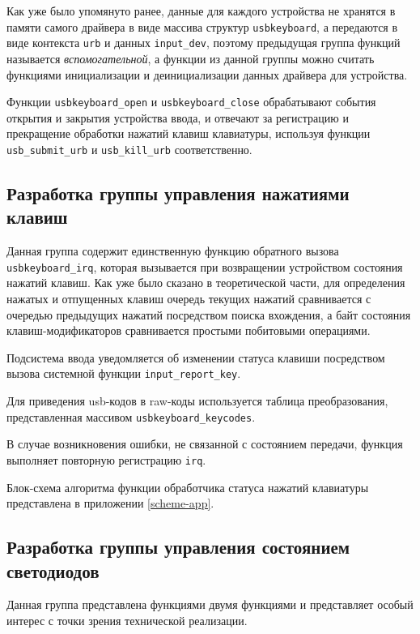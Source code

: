 Как уже было упомянуто ранее, данные для каждого устройства не хранятся в памяти самого драйвера
в виде массива структур \texttt{usbkeyboard}, а передаются в виде контекста \texttt{urb} и данных \texttt{input\_dev},
поэтому предыдущая группа функций называется \emph{вспомогательной},
а функции из данной группы можно считать функциями инициализации и деинициализации
данных драйвера для устройства.

Функции \texttt{usbkeyboard\_open} и \texttt{usbkeyboard\_close} обрабатывают события
открытия и закрытия устройства ввода, и отвечают за регистрацию и прекращение
обработки нажатий клавиш клавиатуры, 
используя функции \texttt{usb\_submit\_urb} и \texttt{usb\_kill\_urb}
соответственно.

\subsection{Разработка группы управления нажатиями клавиш}

Данная группа содержит единственную функцию обратного вызова
\texttt{usbkeyboard\_irq}, 
которая вызывается при возвращении устройством состояния
нажатий клавиш. Как уже было сказано в теоретической части,
для определения нажатых и отпущенных клавиш очередь текущих нажатий
сравнивается с очередью предыдущих нажатий посредством поиска вхождения, 
а байт состояния клавиш-модификаторов сравнивается простыми 
побитовыми операциями. 

Подсистема ввода уведомляется об изменении статуса
клавиши посредством вызова системной функции \texttt{input\_report\_key}.

Для приведения usb-кодов в raw-коды используется таблица
преобразования, представленная массивом \texttt{usbkeyboard\_keycodes}.

В случае возникновения ошибки, не связанной с состоянием
передачи, функция выполняет повторную регистрацию \texttt{irq}.

Блок-схема алгоритма функции обработчика статуса нажатий клавиатуры представлена
в приложении \ref{scheme-app}.

\subsection{Разработка группы управления состоянием светодиодов} \label{dev-leds-group}

Данная группа представлена функциями 
двумя функциями и представляет
особый интерес с точки зрения технической реализации.


